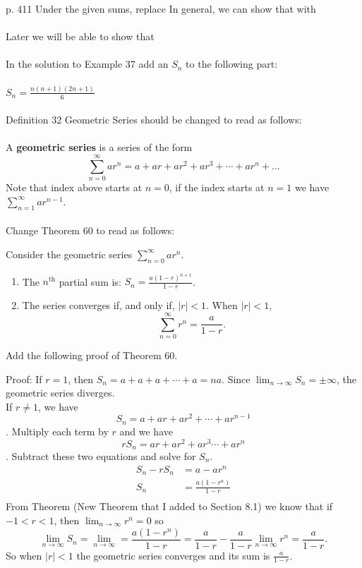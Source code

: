 \documentclass[10pt]{article}
\newcommand{\ds}{\displaystyle}
\begin{document}
p. 411    Under the given sums, replace In general, we can show that with \\ \\

Later we will be able to show that    \\ \\

In the solution to Example 37 add an $S_n$  to the following part:\\ \\

$\ds S_n=\frac{n(n+1)(2n+1)}{6}$ \\ \\

Definition 32 Geometric Series should be changed to read as follows:\\ \\ 

A \textbf{geometric series} is a series of the form $$\ds \sum_{n=0}^\infty ar^n=a+ar+ar^2+ar^3+\cdots+ar^n+...$$
Note that index above starts at $n=0$, if the index starts at $n=1$ we have $\ds \sum_{n=1}^\infty ar^{n-1}$. \\ \\

Change Theorem 60 to read as follows:

Consider the geometric series $\ds \sum_{n=0}^\infty ar^n$.
\begin{enumerate}
\item		The $n^\text{th}$ partial sum is: $\ds S_n = \frac{a(1-r)^{n+1}}{1-r}$.
\item		The series converges if, and only if, $|r| < 1$. When $|r|<1$, 
$$\sum_{n=0}^\infty r^n = \frac{a}{1-r}.$$
\end{enumerate}

Add the following proof of Theorem 60.

Proof:  If $r=1$, then $S_n=a+a+a+\cdots+a=na$. Since $\lim_{n\to \infty} S_n=\pm \infty$, the geometric series diverges.\\
If $r\neq 1$, we have $$S_n=a+ar+ar^2+\cdots +ar^{n-1}$$. Multiply each term by $r$ and we have 
$$rS_n=ar+ar^2+ar^3\cdots +ar^n$$.  Subtract these two equations and solve for $S_n$.
\begin{align*}
S_n-rS_n &=a-ar^n \\
S_n &=\frac{a(1-r^n)}{1-r}\\
\end{align*}
From Theorem {(New Theorem that I added to Section 8.1)} we know that if $-1<r<1$, then $\ds \lim_{n\to \infty} r^n=0$ so
$$\lim_{n\to \infty} S_n=\lim_{n\to \infty}=\frac{a(1-r^n)}{1-r}=\frac{a}{1-r}- \frac{a}{1-r}\lim_{n\to \infty}r^n=\frac{a}{1-r}.$$ So when $|r|<1$ the geometric series converges and its sum is $\ds \frac{a}{1-r}$. \\
\end{document}
